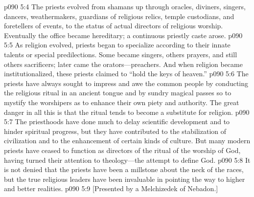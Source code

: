 \pc \vs p090 5:4 The priests evolved from shamans up through oracles, diviners, singers, dancers, weathermakers, guardians of religious relics, temple custodians, and foretellers of events, to the status of actual directors of religious worship. Eventually the office became hereditary; a continuous priestly caste arose.
\vs p090 5:5 As religion evolved, priests began to specialize according to their innate talents or special predilections. Some became singers, others prayers, and still others sacrificers; later came the orators---preachers. And when religion became institutionalized, these priests claimed to “hold the keys of heaven.”
\vs p090 5:6 The priests have always sought to impress and awe the common people by conducting the religious ritual in an ancient tongue and by sundry magical passes so to mystify the worshipers as to enhance their own piety and authority. The great danger in all this is that the ritual tends to become a substitute for religion.
\vs p090 5:7 The priesthoods have done much to delay scientific development and to hinder spiritual progress, but they have contributed to the stabilization of civilization and to the enhancement of certain kinds of culture. But many modern priests have ceased to function as directors of the ritual of the worship of God, having turned their attention to theology---the attempt to define God.\plusone
\vs p090 5:8 It is not denied that the priests have been a millstone about the neck of the races, but the true religious leaders have been invaluable in pointing the way to higher and better realities.
\vsetoff
\vs p090 5:9 [Presented by a Melchizedek of Nebadon.]
